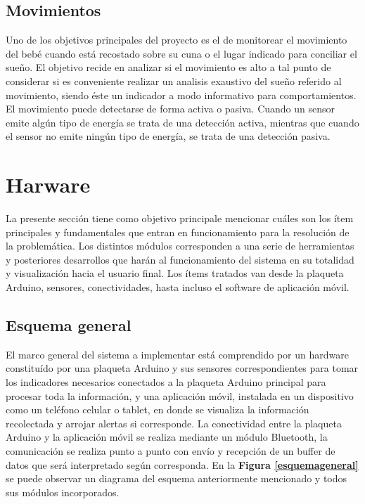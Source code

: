 \documentclass{IEEEtran}
\begin{document}
		\subsection{Movimientos}

			Uno de los objetivos principales del proyecto es el de monitorear el movimiento del bebé cuando está recostado sobre su cuna o el lugar indicado para conciliar el sueño. El objetivo recide en analizar si el movimiento es alto a tal punto de considerar si es conveniente realizar un analisis exaustivo del sueño referido al movimiento, siendo éste un indicador a modo informativo para comportamientos. El movimiento puede detectarse de forma activa o pasiva. Cuando un sensor emite algún tipo de energía se trata de una detección activa, mientras que cuando el sensor no emite ningún tipo de energía, se trata de una detección pasiva.

	\section{Harware}

		La presente sección tiene como objetivo principale mencionar cuáles son los ítem principales y fundamentales que entran en funcionamiento para la resolución de la problemática. Los distintos módulos corresponden a una serie de herramientas y posteriores desarrollos que harán al funcionamiento del sistema en su totalidad y visualización hacia el usuario final. Los ítems tratados van desde la plaqueta Arduino, sensores, conectividades, hasta incluso el software de aplicación móvil.

		\subsection{Esquema general}

			El marco general del sistema a implementar está comprendido por un hardware constituído por una plaqueta Arduino y sus sensores correspondientes para tomar los indicadores necesarios conectados a la plaqueta Arduino principal para procesar toda la información, y una aplicación móvil, instalada en un dispositivo como un teléfono celular o tablet, en donde se visualiza la información recolectada y arrojar alertas si corresponde. La conectividad entre la plaqueta Arduino y la aplicación móvil se realiza mediante un módulo Bluetooth, la comunicación se realiza punto a punto con envío y recepción de un buffer de datos que será interpretado según corresponda. En la \textbf{Figura \ref{esquemageneral}} se puede observar un diagrama del esquema anteriormente mencionado y todos sus módulos incorporados.
\end{document}
